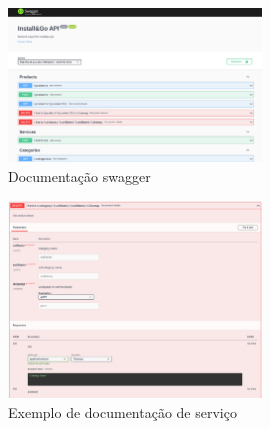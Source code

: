 \begin{figure}[htb]
  \centering
  \includegraphics[width=0.6\textwidth]{images/implementacao/api/swagger_intro.png}
  \caption{Documentação swagger}
  \label{fig:67}
\end{figure}

\begin{figure}[htb]
  \centering
  \includegraphics[width=0.6\textwidth]{images/implementacao/api/swagger_pedido.png}
  \caption{Exemplo de documentação de serviço}
  \label{fig:68}
\end{figure}